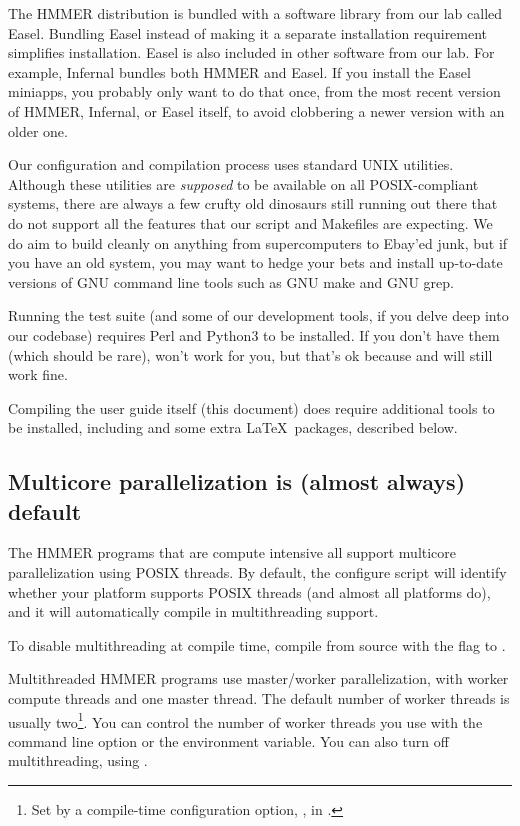 The HMMER distribution is bundled with a software library from our lab
called Easel.
Bundling Easel instead of making it a separate installation
requirement simplifies installation. Easel is also included in other
software from our lab. For example,
Infernal
bundles both HMMER and Easel. If you install the Easel miniapps, you
probably only want to do that once, from the most recent version of
HMMER, Infernal, or Easel itself, to avoid clobbering a newer version
with an older one.

Our configuration and compilation process uses standard UNIX
utilities. Although these utilities are \emph{supposed} to be
available on all POSIX-compliant systems, there are always a few
crufty old dinosaurs still running out there that do not support all
the features that our  script and Makefiles are
expecting. We do aim to build cleanly on anything from supercomputers
to Ebay'ed junk, but if you have an old system, you may want to hedge
your bets and install up-to-date versions of GNU command line tools
such as GNU make and GNU grep.

Running the test suite (and some of our development tools, if you
delve deep into our codebase) requires Perl and Python3 to be
installed.  If you don't have them (which should be rare),  won't work for you, but that's ok because  and
 will still work fine.

Compiling the user guide itself (this document) does require
additional tools to be installed, including  and some extra
\LaTeX\ packages, described below.


\subsection{Multicore parallelization is (almost always) default}

The HMMER programs that are compute intensive all support multicore
parallelization using POSIX threads. By default, the configure script
will identify whether your platform supports POSIX threads (and almost
all platforms do), and it will automatically compile in multithreading
support.

To disable multithreading at compile time, compile from source with
the  flag to .

Multithreaded HMMER programs use master/worker parallelization, with
 worker compute threads and one master thread.  The default
number of worker threads is usually two\footnote{Set by a compile-time
configuration option, , in
.}. You can control the number of worker
threads you use with the  command line option or
the  environment variable. You can also turn off
multithreading, using .

